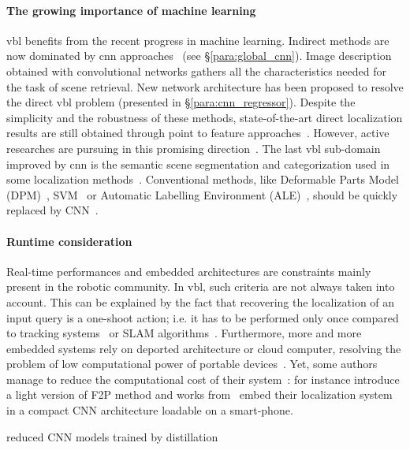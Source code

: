 		\paragraph{The growing importance of machine learning}
			\ac{vbl} benefits from the recent progress in machine learning. Indirect methods are now dominated by \ac{cnn} approaches~\citep{Radenovic2016,Gordo2016} (see \S\ref{para:global_cnn}). Image description obtained with convolutional networks gathers all the characteristics needed for the task of scene retrieval. New network architecture has been proposed to resolve the direct \ac{vbl} problem (presented in \S\ref{para:cnn_regressor}). Despite the simplicity and the robustness of these methods, state-of-the-art direct localization results are still obtained through point to feature approaches~\citep{Walch2016a}. However, active researches are pursuing in this promising direction~\citep{Liu2016,Jia2016,Kendall2017}. The last \ac{vbl} sub-domain improved by \ac{cnn} is the semantic scene segmentation and categorization used in some localization methods~\citep{Salas-Moreno2013,Ardeshir2014,Arth2015,Christie2016}. Conventional methods, like Deformable Parts Model (DPM)~\citep{Ardeshir2014}, SVM~\citep{Arth2015} or Automatic Labelling Environment (ALE)~\citep{Christie2016}, should be quickly replaced by CNN~\citep{Sunderhauf2015a,Zhao2016}.
     
     	\paragraph{Runtime consideration}
	     	\label{para:runtime}
	     	Real-time performances and embedded architectures are constraints mainly present in the robotic community. In \ac{vbl}, such criteria are not always taken into account. This can be explained by the fact that recovering the localization of an input query is a one-shoot action; i.e. it has to be performed only once compared to tracking systems~\citep{Marchand2016} or SLAM algorithms~\citep{Garcia-Fidalgo2015}. Furthermore, more and more embedded systems rely on deported architecture or cloud computer, resolving the problem of low computational power of portable devices~\citep{Middelberg2014}. Yet, some authors manage to reduce the computational cost of their system~\citep{Shotton2013,Glocker2015,Lynen2015}: for instance \citet{Feng2016a} introduce a light version of F2P method and works from~\citep{Weyand2016,Kendall2015,Contreras2017} embed their localization system in a compact CNN architecture loadable on a smart-phone. 
	     	
	     	reduced CNN models trained by distillation 
	        
        
        
            